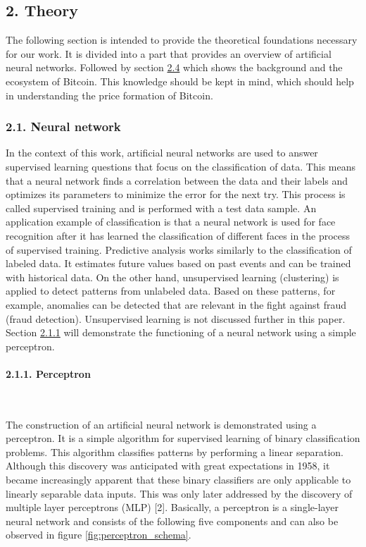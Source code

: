 \documentclass[
]{article}
\begin{document}
\newpage

\hypertarget{theory}{%
\subsection{2. Theory}\label{theory}}

The following section is intended to provide the theoretical foundations
necessary for our work. It is divided into a part that provides an
overview of artificial neural networks. Followed by section
\protect\hyperlink{bitcoin}{2.4} which shows the background and the
ecosystem of Bitcoin. This knowledge should be kept in mind, which
should help in understanding the price formation of Bitcoin.

\hypertarget{neural_network}{%
\subsubsection{2.1. Neural network}\label{neural_network}}

In the context of this work, artificial neural networks are used to
answer supervised learning questions that focus on the classification of
data. This means that a neural network finds a correlation between the
data and their labels and optimizes its parameters to minimize the error
for the next try. This process is called supervised training and is
performed with a test data sample. An application example of
classification is that a neural network is used for face recognition
after it has learned the classification of different faces in the
process of supervised training. Predictive analysis works similarly to
the classification of labeled data. It estimates future values based on
past events and can be trained with historical data. On the other hand,
unsupervised learning (clustering) is applied to detect patterns from
unlabeled data. Based on these patterns, for example, anomalies can be
detected that are relevant in the fight against fraud (fraud detection).
Unsupervised learning is not discussed further in this paper. Section
\protect\hyperlink{perceptron}{2.1.1} will demonstrate the functioning
of a neural network using a simple perceptron.

\hypertarget{perceptron}{%
\paragraph{2.1.1. Perceptron}\label{perceptron}}

~

The construction of an artificial neural network is demonstrated using a
perceptron. It is a simple algorithm for supervised learning of binary
classification problems. This algorithm classifies patterns by
performing a linear separation. Although this discovery was anticipated
with great expectations in 1958, it became increasingly apparent that
these binary classifiers are only applicable to linearly separable data
inputs. This was only later addressed by the discovery of multiple layer
perceptrons (MLP) {[}2{]}. Basically, a perceptron is a single-layer
neural network and consists of the following five components and can
also be observed in figure \ref{fig:perceptron_schema}.
\end{document}
